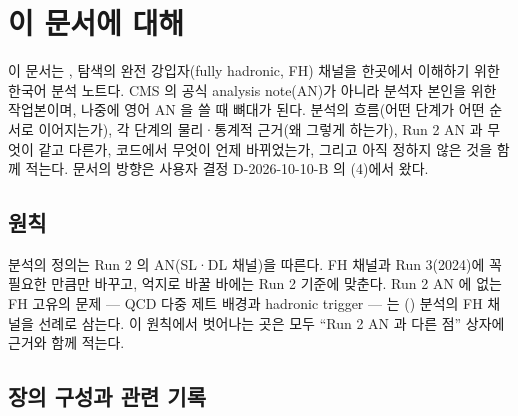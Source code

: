 \chapter{이 문서에 대해}\label{ch:about}

이 문서는 \ttHH, \HHfourb{} 탐색의 완전 강입자(fully hadronic, FH) 채널을 한곳에서 이해하기 위한 한국어 분석 노트다.
CMS 의 공식 analysis note(AN)가 아니라 분석자 본인을 위한 작업본이며, 나중에 영어 AN 을 쓸 때 뼈대가 된다.
분석의 흐름(어떤 단계가 어떤 순서로 이어지는가), 각 단계의 물리·통계적 근거(왜 그렇게 하는가), Run 2 AN 과 무엇이 같고 다른가,
코드에서 무엇이 언제 바뀌었는가, 그리고 아직 정하지 않은 것을 함께 적는다.
문서의 방향은 사용자 결정 D-2026-10-10-B 의 (4)에서 왔다.

\section{원칙}\label{sec:about-principles}

분석의 정의는 Run 2 의 \ttHH{} AN(SL·DL 채널)을 따른다. FH 채널과 Run 3(2024)에 꼭 필요한 만큼만 바꾸고,
억지로 바꿀 바에는 Run 2 기준에 맞춘다. Run 2 AN 에 없는 FH 고유의 문제 — QCD 다중 제트 배경과 hadronic trigger —
는 \ttH(\bbbar) 분석의 FH 채널을 선례로 삼는다. 이 원칙에서 벗어나는 곳은 모두 ``Run 2 AN 과 다른 점'' 상자에
근거와 함께 적는다.

\section{장의 구성과 관련 기록}\label{sec:about-map}

